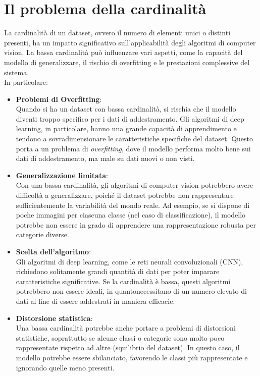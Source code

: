 \documentclass[12pt,a4paper,openright,twoside]{book}
\begin{document}
\section{Il problema della cardinalità}
La cardinalità di un dataset, ovvero il numero di elementi unici o distinti presenti, ha un impatto significativo sull'applicabilità degli algoritmi di computer vision. La bassa cardinalità può influenzare vari aspetti, come la capacità del modello di generalizzare, il rischio di overfitting e le prestazioni complessive del sistema.\\
In particolare: 
\begin{itemize}
\item \textbf{Problemi di Overfitting}:\\
Quando si ha un dataset con bassa cardinalità, si rischia che il modello diventi troppo specifico per i dati di addestramento. Gli algoritmi di deep learning, in particolare, hanno una grande capacità di apprendimento e tendono a sovradimensionare le caratteristiche specifiche del dataset. Questo porta a un problema di {\itshape overfitting}, dove il modello performa molto bene sui dati di addestramento, ma male su dati nuovi o non visti.

\item \textbf{Generalizzazione limitata}:\\
Con una bassa cardinalità, gli algoritmi di computer vision potrebbero avere difficoltà a generalizzare, poiché il dataset potrebbe non rappresentare sufficientemente la variabilità del mondo reale. Ad esempio, se si dispone di poche immagini per ciascuna classe (nel caso di classificazione), il modello potrebbe non essere in grado di apprendere una rappresentazione robusta per categorie diverse.

\item \textbf{Scelta dell'algoritmo}:\\
Gli algoritmi di deep learning, come le reti neurali convoluzionali (CNN), richiedono solitamente grandi quantità di dati per poter imparare caratteristiche significative. Se la cardinalità è bassa, questi algoritmi potrebbero non essere ideali, in quantonecessitano di un numero elevato di dati al fine di essere addestrati in maniera efficacie.

\item \textbf{Distorsione statistica}:\\
Una bassa cardinalità potrebbe anche portare a problemi di distorsioni statistiche, soprattutto se alcune classi o categorie sono molto poco rappresentate rispetto ad altre (squilibrio del dataset). In questo caso, il modello potrebbe essere sbilanciato, favorendo le classi più rappresentate e ignorando quelle meno presenti.
\end{itemize}
\end{document}

